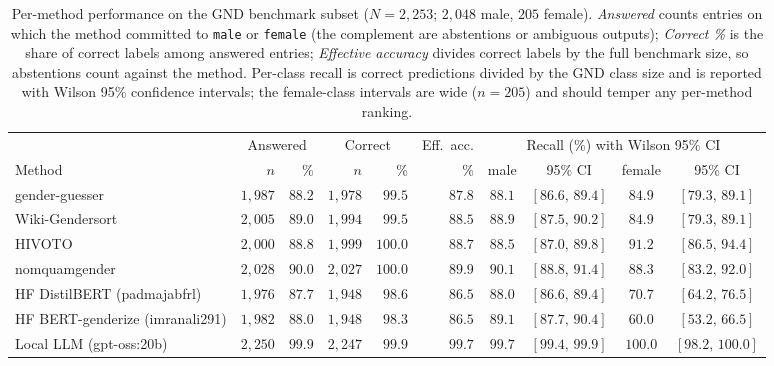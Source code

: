 \documentclass{eceasst}
\begin{document}
\begin{table}[h]
  \centering
  \scriptsize
  \setlength{\tabcolsep}{3pt}
  \begin{tabular}{lrrrrrcccc}
    \toprule
                                    & \multicolumn{2}{c}{Answered} & \multicolumn{2}{c}{Correct} & Eff.\ acc. & \multicolumn{4}{c}{Recall (\%) with Wilson 95\% CI} \\
    \cmidrule(lr){2-3}\cmidrule(lr){4-5}\cmidrule(lr){7-10}
    Method                          & $n$ & \%      & $n$ & \%      & \%      & male  & 95\% CI         & female & 95\% CI \\
    \midrule
    gender-guesser                  & $1{,}987$ & $88.2$ & $1{,}978$ & $99.5$  & $87.8$ & $88.1$ & $[86.6,\,89.4]$ & $84.9$  & $[79.3,\,89.1]$ \\
    Wiki-Gendersort                 & $2{,}005$ & $89.0$ & $1{,}994$ & $99.5$  & $88.5$ & $88.9$ & $[87.5,\,90.2]$ & $84.9$  & $[79.3,\,89.1]$ \\
    HIVOTO                          & $2{,}000$ & $88.8$ & $1{,}999$ & $100.0$ & $88.7$ & $88.5$ & $[87.0,\,89.8]$ & $91.2$  & $[86.5,\,94.4]$ \\
    nomquamgender                   & $2{,}028$ & $90.0$ & $2{,}027$ & $100.0$ & $89.9$ & $90.1$ & $[88.8,\,91.4]$ & $88.3$  & $[83.2,\,92.0]$ \\
    HF DistilBERT (padmajabfrl)     & $1{,}976$ & $87.7$ & $1{,}948$ & $98.6$  & $86.5$ & $88.0$ & $[86.6,\,89.4]$ & $70.7$  & $[64.2,\,76.5]$ \\
    HF BERT-genderize (imranali291) & $1{,}982$ & $88.0$ & $1{,}948$ & $98.3$  & $86.5$ & $89.1$ & $[87.7,\,90.4]$ & $60.0$  & $[53.2,\,66.5]$ \\
    Local LLM (gpt-oss:20b)         & $2{,}250$ & $99.9$ & $2{,}247$ & $99.9$  & $99.7$ & $99.7$ & $[99.4,\,99.9]$ & $100.0$ & $[98.2,\,100.0]$ \\
    \bottomrule
  \end{tabular}
  \caption{Per-method performance on the GND benchmark subset ($N = 2{,}253$; $2{,}048$ male, $205$ female). \emph{Answered} counts entries on which the method committed to \texttt{male} or \texttt{female} (the complement are abstentions or ambiguous outputs); \emph{Correct \%} is the share of correct labels among answered entries; \emph{Effective accuracy} divides correct labels by the full benchmark size, so abstentions count against the method. Per-class recall is correct predictions divided by the GND class size and is reported with Wilson 95\% confidence intervals; the female-class intervals are wide ($n=205$) and should temper any per-method ranking.}
  \label{tab:gnd-benchmark}
\end{table}
\end{document}
